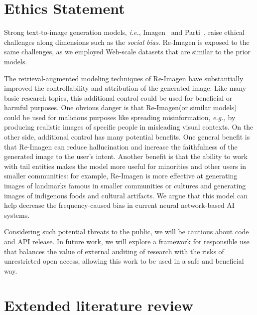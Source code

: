 \documentclass{article} \usepackage{iclr2023_conference,times}
\newcommand{\ie}{\textit{i.e.}}
\newcommand{\modelname}{{Re-Imagen}\xspace}
\begin{document}
\section*{Ethics Statement}
\label{broader_impact}

Strong text-to-image generation models, \ie, Imagen~\citep{saharia2022photorealistic} and Parti~\citep{yu2022scaling}, raise ethical challenges along dimensions such as the \textit{social bias}. \modelname is exposed to the same challenges, as we employed Web-scale datasets that are similar to the prior models.

The retrieval-augmented modeling techniques of \modelname have substantially improved the controllability and attribution of the generated image.  Like many basic research topics, this additional control could be used for beneficial or harmful purposes.  One obvious danger is that \modelname (or similar models)  could be used for malicious purposes like spreading misinformation, \textit{e.g.,} by producing realistic images of specific people in misleading visual contexts. On the other side, additional control has many potential benefits.  One general benefit is that \modelname can reduce hallucination and increase the faithfulness of the generated image to the user's intent.  Another benefit is that the ability to work with tail entities makes the model more useful for minorities and other users in smaller communities: for example, \modelname is more effective at generating images of landmarks famous in smaller communities or cultures and generating images of indigenous foods and cultural artifacts. We argue that this model can help decrease the frequency-caused bias in current neural network-based AI systems.

Considering such potential threats to the public, we will be cautious about code and API release. In future work, we will explore a framework for responsible use that balances the value of external auditing of research with the risks of unrestricted open access, allowing this work to be used in a safe and beneficial way.







\clearpage

\appendix

\section{Extended literature review}
\label{extended_review}
\end{document}
